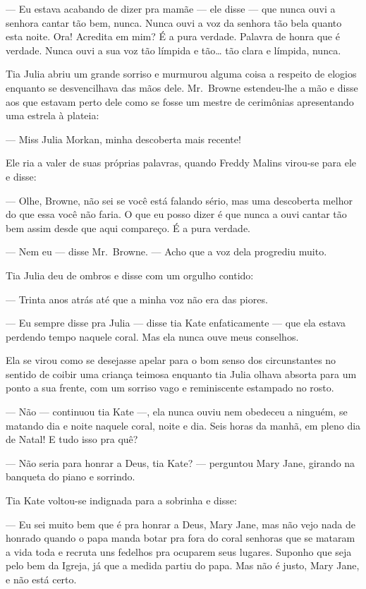--- Eu estava acabando de dizer pra mamãe --- ele disse --- que nunca ouvi a
senhora cantar tão bem, nunca.  Nunca ouvi a voz da senhora tão bela quanto
esta noite.  Ora!  Acredita em mim?  É a pura verdade.  Palavra de honra que é
verdade.  Nunca ouvi a sua voz tão límpida e tão\ldots{} tão clara e límpida,
nunca.

Tia Julia abriu um grande sorriso e murmurou alguma coisa a respeito de elogios
enquanto se desvencilhava das mãos dele.  Mr.~Browne estendeu-lhe a mão e disse
aos que estavam perto dele como se fosse um mestre de cerimônias apresentando
uma estrela à plateia:

--- Miss Julia Morkan, minha descoberta mais recente!

Ele ria a valer de suas próprias palavras, quando Freddy Malins virou-se para
ele e disse:

--- Olhe, Browne, não sei se você está falando sério, mas uma descoberta melhor
do que essa você não faria.  O que eu posso dizer é que nunca a ouvi cantar tão
bem assim desde que aqui compareço.  É a pura verdade.

--- Nem eu --- disse Mr.~Browne.  --- Acho que a voz dela progrediu muito.

Tia Julia deu de ombros e disse com um orgulho contido:

--- Trinta anos atrás até que a minha voz não era das piores.

--- Eu sempre disse pra Julia --- disse tia Kate enfaticamente --- que ela
estava perdendo tempo naquele coral.  Mas ela nunca ouve meus conselhos.

Ela se virou como se desejasse apelar para o bom senso dos circunstantes no
sentido de coibir uma criança teimosa enquanto tia Julia olhava absorta para um
ponto a sua frente, com um sorriso vago e reminiscente estampado no rosto.

--- Não --- continuou tia Kate ---, ela nunca ouviu nem obedeceu a ninguém, se
matando dia e noite naquele coral, noite e dia.  Seis horas da manhã, em pleno
dia de Natal!  E tudo isso pra quê?

--- Não seria para honrar a Deus, tia Kate? --- perguntou Mary Jane, girando na
banqueta do piano e sorrindo.

Tia Kate voltou-se indignada para a sobrinha e disse:

--- Eu sei muito bem que é pra honrar a Deus, Mary Jane, mas não vejo nada de
honrado quando o papa manda botar pra fora do coral senhoras que se mataram a
vida toda e recruta uns fedelhos pra ocuparem seus lugares.  Suponho que seja
pelo bem da Igreja, já que a medida partiu do papa.  Mas não é justo, Mary
Jane, e não está certo.

